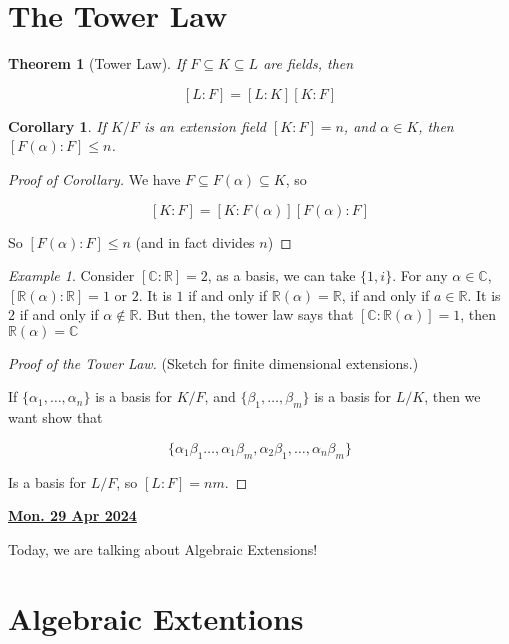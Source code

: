 \documentclass[12pt]{article}
\renewcommand{\date}[1]{\underline{\bf #1}}
\def\R{{\mathbb R}}
\def\C{{\mathbb C}}
\newtheorem{theorem}{Theorem}
\newtheorem{corollary}{Corollary}
\theoremstyle{remark}
\theoremstyle{remark}
\theoremstyle{remark}
\newtheorem{example}{Example}
\theoremstyle{remark}
\theoremstyle{remark}
\begin{document}
\section{The Tower Law}

\begin{theorem}[Tower Law]
  If $F \subseteq K \subseteq L$ are fields, then 

  \[
    [L : F] = [L : K][K : F]
  \]
\end{theorem}

\begin{corollary}
  If $K / F$ is an extension field $[K : F] = n$, and $\alpha \in K$, then
  $[F(\alpha) : F] \le n$.
\end{corollary}

\begin{proof}[Proof of Corollary]
  We have $F \subseteq F(\alpha) \subseteq K$, so

  \[
    [K : F] = [K : F(\alpha)][F(\alpha) : F]
  \]

  So $[F(\alpha) : F] \le n$ (and in fact divides $n$)
\end{proof}

\begin{example}
  Consider $[\C : \R] = 2$, as a basis, we can take $\{1, i\}$. For any $\alpha
  \in \C$, $[\R(\alpha) : \R] = 1$ or $2$. It is $1$ if and only if $\R(\alpha)
  = \R$, if and only if $a \in \R$. It is $2$ if and only if $\alpha \not\in
  \R$. But then, the tower law says that $[\C : \R(\alpha)] = 1$, then
  $\R(\alpha) = \C$
\end{example}

\begin{proof}[Proof of the Tower Law]
  (Sketch for finite dimensional extensions.)

  If $\{ \alpha_1, \dots, \alpha_n \}$ is a basis for $K / F$, and $\{\beta_1,
  \dots, \beta_m\}$ is a basis for $L / K$, then we want show that 

  \[
    \{\alpha_1 \beta_1 \dots, \alpha_1 \beta_m, \alpha_2 \beta_1, \dots, \alpha_n \beta_m \}
  \]

  Is a basis for $L / F$, so $[L : F] = nm$.
\end{proof}

\date{Mon. 29 Apr 2024}

Today, we are talking about Algebraic Extensions!

\section {Algebraic Extentions}
\end{document}
